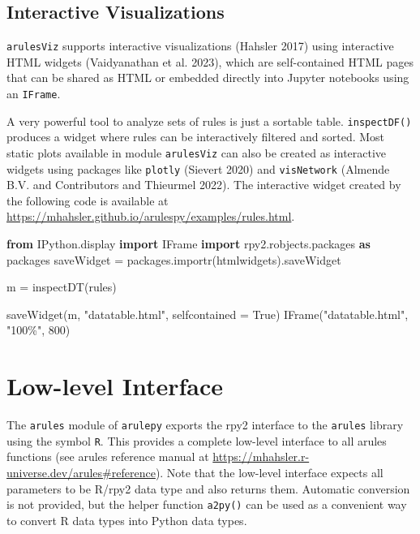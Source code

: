 \documentclass{article}
\newenvironment{Shaded}{}{}
\newcommand{\DecValTok}[1]{\textcolor[rgb]{0.25,0.63,0.44}{#1}}
\newcommand{\ImportTok}[1]{\textcolor[rgb]{0.00,0.50,0.00}{\textbf{#1}}}
\newcommand{\NormalTok}[1]{#1}
\newcommand{\OperatorTok}[1]{\textcolor[rgb]{0.40,0.40,0.40}{#1}}
\newcommand{\StringTok}[1]{\textcolor[rgb]{0.25,0.44,0.63}{#1}}
\newcommand{\VariableTok}[1]{\textcolor[rgb]{0.10,0.09,0.49}{#1}}
\begin{document}
\hypertarget{interactive-visualizations}{%
\subsection{Interactive
Visualizations}\label{interactive-visualizations}}

\texttt{arulesViz} supports interactive visualizations (Hahsler 2017)
using interactive HTML widgets (Vaidyanathan et al. 2023), which are
self-contained HTML pages that can be shared as HTML or embedded
directly into Jupyter notebooks using an \texttt{IFrame}.

A very powerful tool to analyze sets of rules is just a sortable table.
\texttt{inspectDF()} produces a widget where rules can be interactively
filtered and sorted. Most static plots available in module
\texttt{arulesViz} can also be created as interactive widgets using
packages like \texttt{plotly} (Sievert 2020) and \texttt{visNetwork}
(Almende B.V. and Contributors and Thieurmel 2022). The interactive
widget created by the following code is available at
\url{https://mhahsler.github.io/arulespy/examples/rules.html}.

\begin{Shaded}
\begin{Highlighting}[]
\ImportTok{from}\NormalTok{ IPython.display }\ImportTok{import}\NormalTok{ IFrame}
\ImportTok{import}\NormalTok{ rpy2.robjects.packages }\ImportTok{as}\NormalTok{ packages}
\NormalTok{saveWidget }\OperatorTok{=}\NormalTok{ packages.importr(}\StringTok{\textquotesingle{}htmlwidgets\textquotesingle{}}\NormalTok{).saveWidget}

\NormalTok{m }\OperatorTok{=}\NormalTok{ inspectDT(rules)}

\NormalTok{saveWidget(m, }\StringTok{"datatable.html"}\NormalTok{, selfcontained }\OperatorTok{=} \VariableTok{True}\NormalTok{)}
\NormalTok{IFrame(}\StringTok{"datatable.html"}\NormalTok{, }\StringTok{"100\%"}\NormalTok{, }\DecValTok{800}\NormalTok{)}
\end{Highlighting}
\end{Shaded}

\hypertarget{low-level-interface}{%
\section{Low-level Interface}\label{low-level-interface}}

The \texttt{arules} module of \texttt{arulepy} exports the rpy2
interface to the \texttt{arules} library using the symbol \texttt{R}.
This provides a complete low-level interface to all arules functions
(see arules reference manual at
\url{https://mhahsler.r-universe.dev/arules\#reference}). Note that the
low-level interface expects all parameters to be R/rpy2 data type and
also returns them. Automatic conversion is not provided, but the helper
function \texttt{a2py()} can be used as a convenient way to convert R
data types into Python data types.
\end{document}
